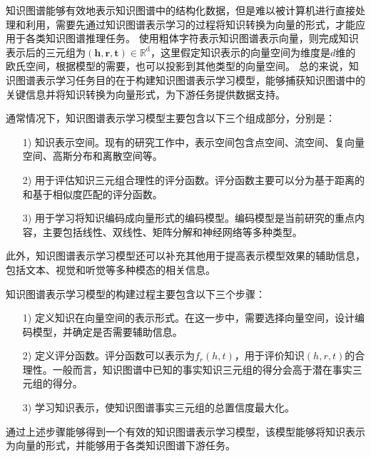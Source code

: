 \documentclass[algorithmlist, AutoFakeBold, AutoFakeSlant, figurelist, tablelist, nomlist, engineering]{seuthesix}
\begin{document}
知识图谱能够有效地表示知识图谱中的结构化数据，但是难以被计算机进行直接处理和利用，需要先通过知识图谱表示学习的过程将知识转换为向量的形式，才能应用于各类知识图谱推理任务。
使用粗体字符表示知识图谱表示向量，则完成知识表示后的三元组为$\left(\bm{h}, \bm{r}, \bm{t}\right) \in \mathbb{R}^{\mathrm{d}}$，这里假定知识表示的向量空间为维度是$d$维的欧氏空间，根据模型的需要，也可以投影到其他类型的向量空间。
总的来说，知识图谱表示学习任务目的在于构建知识图谱表示学习模型，能够捕获知识图谱中的关键信息并将知识转换为向量形式，为下游任务提供数据支持。

通常情况下，知识图谱表示学习模型主要包含以下三个组成部分，分别是：
\begin{itemize}
  \item [1)] 知识表示空间。现有的研究工作中，表示空间包含点空间、流空间、复向量空间、高斯分布和离散空间等。
  \item [2)] 用于评估知识三元组合理性的评分函数。评分函数主要可以分为基于距离的和基于相似度匹配的评分函数。
  \item [3)] 用于学习将知识编码成向量形式的编码模型。编码模型是当前研究的重点内容，主要包括线性、双线性、矩阵分解和神经网络等多种类型。
\end{itemize}
此外，知识图谱表示学习模型还可以补充其他用于提高表示模型效果的辅助信息，包括文本、视觉和听觉等多种模态的相关信息。

知识图谱表示学习模型的构建过程主要包含以下三个步骤：
\begin{itemize}
  \item [1)] 定义知识在向量空间的表示形式。在这一步中，需要选择向量空间，设计编码模型，并确定是否需要辅助信息。
  \item [2)] 定义评分函数。评分函数可以表示为$f_r(h, t)$，用于评价知识$(h, r, t)$的合理性。一般而言，知识图谱中已知的事实知识三元组的得分会高于潜在事实三元组的得分。
  \item [3)] 学习知识表示，使知识图谱事实三元组的总置信度最大化。
\end{itemize}
通过上述步骤能够得到一个有效的知识图谱表示学习模型，该模型能够将知识表示为向量的形式，并能够用于各类知识图谱下游任务。
\end{document}
